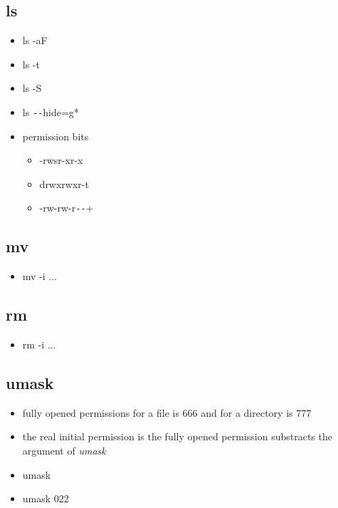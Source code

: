 \documentclass[titlepage]{article}
\begin{document}
      \subsection{ls}
        \begin{itemize}
        	\item ls -aF
        	\item ls -t
        	\item ls -S
        	\item ls \verb|--|hide=g*
        	\item permission bits
        	  \begin{itemize}
        	  	\item -rwsr-xr-x
        	  	\item drwxrwxr-t
        	  	\item -rw-rw-r\verb|--|+
        	  \end{itemize}
        \end{itemize}
      \subsection{mv}
        \begin{itemize}
        	\item mv -i ...
        \end{itemize}
      \subsection{rm}
        \begin{itemize}
        	\item rm -i ...
        \end{itemize}
      \subsection{umask}
        \begin{itemize}
        	\item fully opened permissions for a file is 666 and for a directory is 777
        	\item the real initial permission is the fully opened permission substracts the argument of \emph{umask}
        	\item umask
        	\item umask 022
        \end{itemize}
\end{document}
